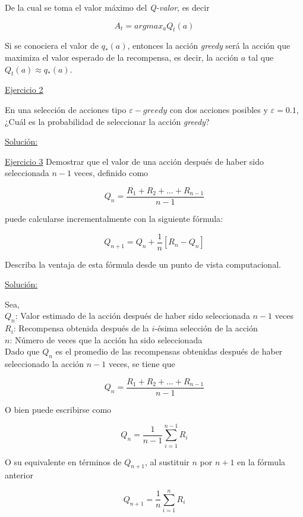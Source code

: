 \documentclass[12pt]{article}
\newlength\tindent
\renewcommand{\indent}{\hspace*{\tindent}}
\begin{document}
    De la cual se toma el valor máximo del \textit{Q-valor}, es decir

    \[
        A_{t} = argmax_{a}Q_{t}(a)
    \]

    Si se conociera el valor de $q_{*}(a)$, entonces la acción \textit{greedy} será la acción que maximiza el valor esperado de la recompensa, es decir, la acción $a$ tal que $Q_{t}(a) \approx q_{*}(a)$.

    \indent\underline{Ejercicio 2}

    En una selección de acciones tipo $\varepsilon-greedy$ con dos acciones posibles y $\varepsilon=0.1$, ¿Cuál es la probabilidad de seleccionar la acción \textit{greedy}?

    \indent\underline{Solución:}

    \indent\underline{Ejercicio 3}
    Demostrar que el valor de una acción después de haber sido seleccionada $n-1$ veces, definido como

    \[ Q_{n} = \frac{R_{1} + R_{2} + \ldots + R_{n-1}}{n-1} \]

    puede calcularse incrementalmente con la siguiente fórmula:

    \[ Q_{n+1} = Q_{n} + \frac{1}{n} \left[ R_{n} - Q_{n} \right] \]

    Describa la ventaja de esta fórmula desde un punto de vista computacional.

    \indent\underline{Solución:}

    Sea,\\
    $Q_{n}$: Valor estimado de la acción después de haber sido seleccionada $n-1$ veces \\
    $R_i$: Recompensa obtenida después de la $i$-ésima selección de la acción \\
    $n$: Número de veces que la acción ha sido seleccionada \\

    Dado que $Q_{n}$ es el promedio de las recompensas obtenidas después de haber seleccionado la acción $n-1$ veces, se tiene que

     \[ Q_{n} = \frac{R_{1} + R_{2} + \ldots + R_{n-1}}{n-1} \]

    O bien puede escribirse como

    \[ Q_{n} = \frac{1}{n-1} \sum_{i=1}^{n-1} R_{i} \]

    O su equivalente en términos de $Q_{n+1}$, al sustituir $n$ por $n+1$ en la fórmula anterior

    \[ Q_{n+1} = \frac{1}{n} \sum_{i=1}^{n} R_{i} \]
\end{document}
